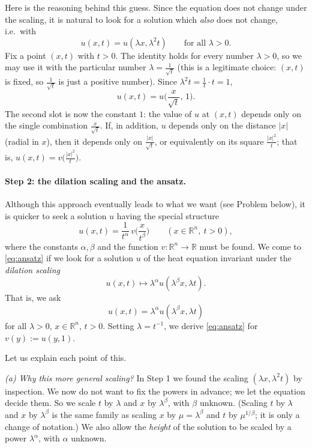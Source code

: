 \documentclass[11pt]{article}
\theoremstyle{plain}
\theoremstyle{definition}
\theoremstyle{remark}
\begin{document}
Here is the reasoning behind this guess. Since the equation does not change under the scaling, it is natural to look for a solution which \emph{also} does not change, i.e.\ with
$$ u(x,t) = u(\lambda x, \lambda^2 t) \qquad \text{for all } \lambda > 0. $$
Fix a point $(x,t)$ with $t > 0$. The identity holds for every number $\lambda > 0$, so we may use it with the particular number $\lambda = \frac{1}{\sqrt t}$ (this is a legitimate choice: $(x,t)$ is fixed, so $\frac1{\sqrt t}$ is just a positive number). Since $\lambda^2 t = \frac1t\cdot t = 1$,
$$ u(x,t) = u\Big(\frac{x}{\sqrt t},\, 1\Big). $$
The second slot is now the constant $1$: the value of $u$ at $(x,t)$ depends only on the single combination $\frac{x}{\sqrt t}$. If, in addition, $u$ depends only on the distance $|x|$ (radial in $x$), then it depends only on $\frac{|x|}{\sqrt t}$, or equivalently on its square $\frac{|x|^2}{t}$; that is, $u(x,t) = v\big(\frac{|x|^2}{t}\big)$.

\paragraph{Step 2: the dilation scaling and the ansatz.}
Although this approach eventually leads to what we want (see Problem below), it is quicker to seek a solution $u$ having the special structure
\begin{equation}\label{eq:ansatz}
u(x,t) = \frac{1}{t^\alpha}\, v\Big(\frac{x}{t^\beta}\Big) \qquad (x \in \mathbb{R}^n,\ t > 0),
\end{equation}
where the constants $\alpha, \beta$ and the function $v : \mathbb{R}^n \to \mathbb{R}$ must be found. We come to \eqref{eq:ansatz} if we look for a solution $u$ of the heat equation invariant under the \emph{dilation scaling}
$$ u(x,t) \mapsto \lambda^\alpha u(\lambda^\beta x, \lambda t). $$
That is, we ask
$$ u(x,t) = \lambda^\alpha u(\lambda^\beta x, \lambda t) $$
for all $\lambda > 0$, $x \in \mathbb{R}^n$, $t > 0$. Setting $\lambda = t^{-1}$, we derive \eqref{eq:ansatz} for $v(y) := u(y,1)$.

Let us explain each point of this.

\emph{(a) Why this more general scaling?} In Step 1 we found the scaling $(\lambda x, \lambda^2 t)$ by inspection. We now do not want to fix the powers in advance; we let the equation decide them. So we scale $t$ by $\lambda$ and $x$ by $\lambda^\beta$, with $\beta$ unknown. (Scaling $t$ by $\lambda$ and $x$ by $\lambda^\beta$ is the same family as scaling $x$ by $\mu = \lambda^\beta$ and $t$ by $\mu^{1/\beta}$; it is only a change of notation.) We also allow the \emph{height} of the solution to be scaled by a power $\lambda^\alpha$, with $\alpha$ unknown.
\end{document}
